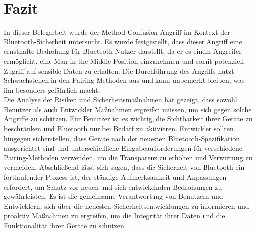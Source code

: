 \documentclass[
    a4paper,
    pagesize,
    pdftex,
    12pt,
]{scrartcl}
\begin{document}
    \section{Fazit}
    In dieser Belegarbeit wurde der Method Confusion Angriff im Kontext der Bluetooth-Sicherheit untersucht. Es wurde festgestellt, dass dieser Angriff eine ernsthafte Bedrohung für Bluetooth-Nutzer darstellt, da er es einem Angreifer ermöglicht, eine Man-in-the-Middle-Position einzunehmen und somit potenziell Zugriff auf sensible Daten zu erhalten. Die Durchführung des Angriffs nutzt Schwachstellen in den Pairing-Methoden aus und kann unbemerkt bleiben, was ihn besonders gefährlich macht. \\
    Die Analyse der Risiken und Sicherheitsmaßnahmen hat gezeigt, dass sowohl Benutzer als auch Entwickler Maßnahmen ergreifen müssen, um sich gegen solche Angriffe zu schützen. Für Benutzer ist es wichtig, die Sichtbarkeit ihrer Geräte zu beschränken und Bluetooth nur bei Bedarf zu aktivieren. Entwickler sollten hingegen sicherstellen, dass Geräte nach der neuesten Bluetooth-Spezifikation ausgerichtet sind und unterschiedliche Eingabeaufforderungen für verschiedene Pairing-Methoden verwenden, um die Transparenz zu erhöhen und Verwirrung zu vermeiden.
    Abschließend lässt sich sagen, dass die Sicherheit von Bluetooth ein fortlaufender Prozess ist, der ständige Aufmerksamkeit und Anpassungen erfordert, um Schutz vor neuen und sich entwickelnden Bedrohungen zu gewährleisten. Es ist die gemeinsame Verantwortung von Benutzern und Entwicklern, sich über die neuesten Sicherheitsentwicklungen zu informieren und proaktiv Maßnahmen zu ergreifen, um die Integrität ihrer Daten und die Funktionalität ihrer Geräte zu schützen. \\

    \newpage

    
    
\end{document}
